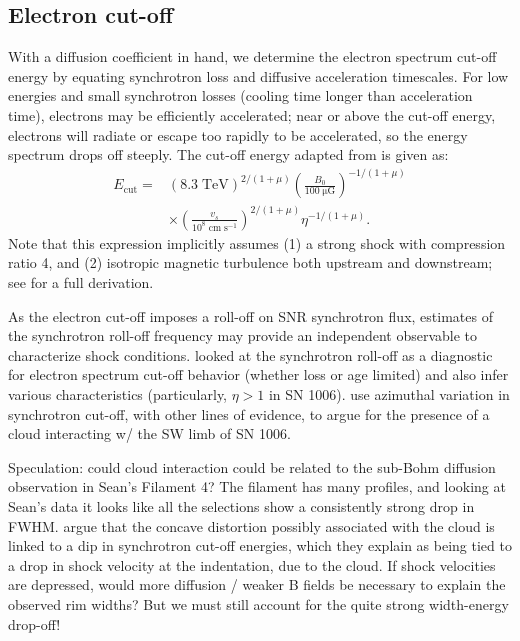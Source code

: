 \documentclass[iop, apj, numberedappendix]{emulateapj}
\newcommand*{\mt}{\mathrm}
\newcommand*{\unit}[1]{\;\mt{#1}}  %
\newcommand*{\Ecut}{E_{\mt{cut}}}
\newcommand*{\muG}{\unit{\mu G}}
\begin{document}
\subsection{Electron cut-off}

With a diffusion coefficient in hand, we determine the electron spectrum
cut-off energy by equating synchrotron loss and diffusive acceleration
timescales.  For low energies and small synchrotron losses (cooling time longer
than acceleration time), electrons may be efficiently accelerated; near or
above the cut-off energy, electrons will radiate or escape too rapidly to be
accelerated, so the energy spectrum drops off steeply.  The cut-off energy
adapted from \citet{parizot2006} is given as:
\begin{align}
    \Ecut =
        &\left(8.3\unit{TeV}\right)^{2/(1+\mu)}
        \left(\frac{B_0}{100 \muG}\right)^{-1/(1+\mu)} \nonumber \\
        &\times \left(\frac{v_s}{10^8 \unit{cm\;s^{-1}}}\right)^{2/(1+\mu)}
        \eta^{-1 / (1+\mu)} .
\end{align}
Note that this expression implicitly assumes (1) a strong shock with
compression ratio 4, and (2) isotropic magnetic turbulence both upstream and
downstream; see \citet{parizot2006} for a full derivation.

As the electron cut-off imposes a roll-off on SNR synchrotron flux,
estimates of the synchrotron roll-off frequency may provide an independent
observable to characterize shock conditions.
\citet{miceli2013, yamazaki2014} looked at the synchrotron roll-off as a
diagnostic for electron spectrum cut-off behavior (whether loss or age limited)
and also infer various characteristics (particularly, $\eta > 1$ in SN 1006).
\citet{miceli2014-cloud} use azimuthal variation in synchrotron cut-off, with
other lines of evidence, to argue for the presence of a cloud interacting w/
the SW limb of SN 1006.

Speculation: could cloud interaction could be related to the sub-Bohm diffusion
observation in Sean's Filament 4?  The filament has many profiles, and looking
at Sean's data it looks like all the selections show a consistently strong drop
in FWHM.  \citet{miceli2013} argue that the concave distortion possibly
associated with the cloud is linked to a dip in synchrotron cut-off energies,
which they explain as being tied to a drop in shock velocity at the
indentation, due to the cloud.  If shock velocities are depressed, would more
diffusion / weaker B fields be necessary to explain the observed rim widths?
But we must still account for the quite strong width-energy drop-off!
\end{document}
